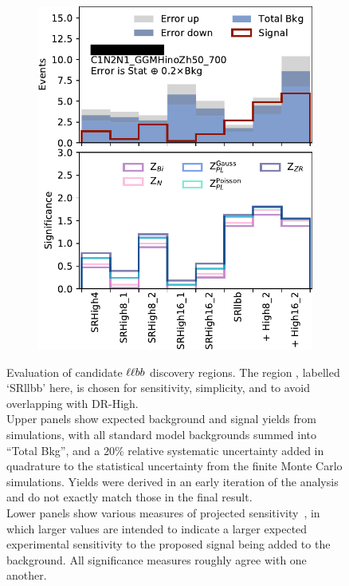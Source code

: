 \begin{figure}[tp]
\begin{subfigure}{0.495\textwidth}
\includegraphics[width=\textwidth]{figures/2ljets_disco_llbb_C1N2N1_GGMHinoZh50_700.png}
\caption{}
\end{subfigure}
\caption[
Evaluation of candidate $\llbb$ discovery regions
]{%
Evaluation of candidate $\llbb$ discovery regions.
The region \srllbb, labelled `SRllbb' here, is chosen for
sensitivity, simplicity, and to avoid overlapping with DR-High.\\[0.5em]
Upper panels show expected background and signal yields from simulations, with
all standard model backgrounds summed into ``Total Bkg'', and a $20\%$
relative systematic uncertainty added in quadrature to the statistical
uncertainty from the finite Monte Carlo simulations.
Yields were derived in an early iteration of the analysis and do not exactly
match those in the final result.\\[0.5em]
Lower panels show various measures of projected
sensitivity~\cite{cousins2008evaluation}, in which larger values are intended
to indicate a larger expected experimental sensitivity to the proposed signal
being added to the background.
All significance measures roughly agree with one another.
}
\label{fig:2ljets_disco_trials_llbb}
\end{figure}

